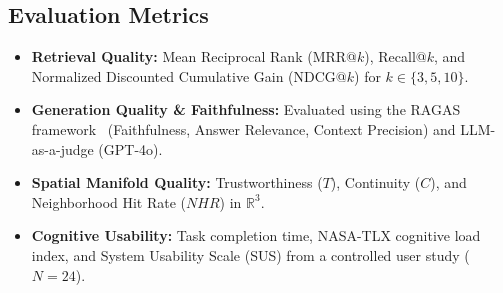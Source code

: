 \subsection{Evaluation Metrics}
\begin{itemize}
    \item \textbf{Retrieval Quality:} Mean Reciprocal Rank (MRR@$k$), Recall@$k$, and Normalized Discounted Cumulative Gain (NDCG@$k$) for $k \in \{3, 5, 10\}$.
    \item \textbf{Generation Quality \& Faithfulness:} Evaluated using the RAGAS framework~\cite{es2023ragas} (Faithfulness, Answer Relevance, Context Precision) and LLM-as-a-judge (GPT-4o).
    \item \textbf{Spatial Manifold Quality:} Trustworthiness ($T$), Continuity ($C$), and Neighborhood Hit Rate ($NHR$) in $\mathbb{R}^3$.
    \item \textbf{Cognitive Usability:} Task completion time, NASA-TLX cognitive load index, and System Usability Scale (SUS) from a controlled user study ($N=24$).
\end{itemize}

